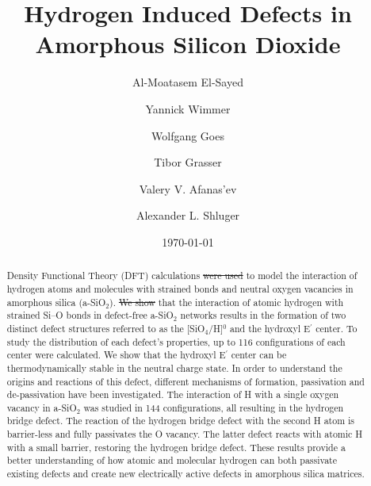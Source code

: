\documentclass[aps,prb,reprint,superscriptaddress,showpacs]{revtex4-1}
\providecommand{\DIFadd}[1]{{\protect\color{blue}\uwave{#1}}} %
\providecommand{\DIFdel}[1]{{\protect\color{red}\sout{#1}}}                      %
\providecommand{\DIFaddbegin}{} %
\providecommand{\DIFaddend}{} %
\providecommand{\DIFdelbegin}{} %
\providecommand{\DIFdelend}{} %
\begin{document}
\title{\DIFaddbegin \DIFadd{Theoretical Models of }\DIFaddend Hydrogen Induced Defects in Amorphous Silicon Dioxide}

\author{Al-Moatasem El-Sayed}
\author{Yannick Wimmer}
\author{Wolfgang Goes}
\author{Tibor Grasser}
\author{Valery V. Afanas'ev}
\author{Alexander L. Shluger}

\date{\today}
\begin{abstract}
\DIFaddbegin \DIFadd{We used }\DIFaddend Density Functional Theory (DFT) calculations \DIFdelbegin \DIFdel{were used }\DIFdelend to model the interaction of hydrogen atoms and molecules with strained bonds and neutral oxygen vacancies in amorphous silica (a-SiO$_2$). \DIFdelbegin \DIFdel{We show }\DIFdelend \DIFaddbegin \DIFadd{The results demonstrate }\DIFaddend that the interaction of atomic hydrogen with strained \mbox{Si--O} bonds in defect-free a-SiO$_2$ networks results in the formation of two distinct defect structures referred to as the [SiO$_4$/H]$^0$ and the hydroxyl E$^\prime$ center. To study the distribution of each defect's properties, up to 116 configurations of each center were calculated. We show that the hydroxyl E$^\prime$ center can be thermodynamically stable in the neutral charge state. In order to understand the origins and reactions of this defect, different mechanisms of formation, passivation and de-passivation have been investigated. The interaction of H with a single oxygen vacancy in a-SiO$_2$ was studied in 144 configurations, all resulting in the hydrogen bridge defect. The reaction of the hydrogen bridge defect with the second H atom is barrier-less and fully passivates the O vacancy. The latter defect reacts with atomic H with a small barrier, restoring the hydrogen bridge defect. These results provide a better understanding of how atomic and molecular hydrogen can both passivate existing defects and create new electrically active defects in amorphous silica matrices.

\end{abstract}
\end{document}
